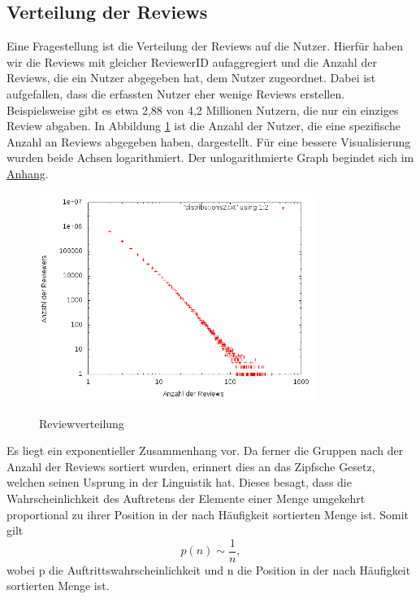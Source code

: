 \documentclass{scrartcl}
\theoremstyle{my_th_style}
\begin{document}
\subsection{Verteilung der Reviews}
Eine Fragestellung ist die Verteilung der Reviews auf die Nutzer. Hierfür haben wir die Reviews mit gleicher ReviewerID aufaggregiert und die Anzahl der Reviews, die ein Nutzer abgegeben hat, dem Nutzer zugeordnet. Dabei ist aufgefallen, dass die erfassten Nutzer eher wenige Reviews erstellen. Beispielsweise gibt es etwa 2,88 von 4,2 Millionen Nutzern, die nur ein einziges Review abgaben. In Abbildung \ref{fig_reviews} ist die Anzahl der Nutzer, die eine spezifische Anzahl an Reviews abgegeben haben, dargestellt. Für eine bessere Visualisierung wurden beide Achsen logarithmiert. Der unlogarithmierte Graph begindet sich im \href{unlog}{Anhang}.
\begin{figure}
    \centering
    \includegraphics[width=0.8\textwidth]{bild.png}
    \label{fig_reviews}
    \caption{Reviewverteilung}
\end{figure}
Es liegt ein exponentieller Zusammenhang vor. Da ferner die Gruppen nach der Anzahl der Reviews sortiert wurden, erinnert dies an das Zipfsche Gesetz, welchen seinen Usprung in der Linguistik hat. Dieses besagt, dass die Wahrscheinlichkeit des Auftretens der Elemente einer Menge umgekehrt proportional zu ihrer Position in der nach Häufigkeit sortierten Menge ist. Somit gilt 
\begin{equation}
	p(n)\sim \frac{1}{n},
\end{equation}
wobei p die Auftrittswahrscheinlichkeit und n die Position in der nach Häufigkeit sortierten Menge ist.
\end{document}
